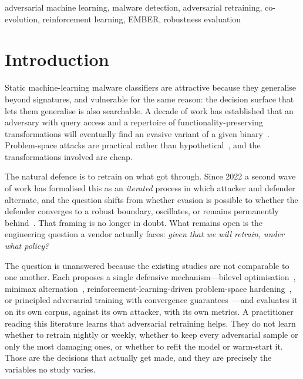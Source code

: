 \documentclass[conference]{IEEEtran}
\begin{document}
\begin{IEEEkeywords}
adversarial machine learning, malware detection, adversarial retraining,
co-evolution, reinforcement learning, EMBER, robustness evaluation
\end{IEEEkeywords}

\section{Introduction}

Static machine-learning malware classifiers are attractive because they
generalise beyond signatures, and vulnerable for the same reason: the decision
surface that lets them generalise is also searchable. A decade of work has
established that an adversary with query access and a repertoire of
functionality-preserving transformations will eventually find an evasive
variant of a given
binary~\cite{anderson2018rl,quertier2022merlin,song2022mab,demetrio2021exemples}.
Problem-space attacks are practical rather than
hypothetical~\cite{pierazzi2020problemspace}, and the transformations involved
are cheap.

The natural defence is to retrain on what got through. Since 2022 a second wave
of work has formalised this as an \emph{iterated} process in which attacker and
defender alternate, and the question shifts from whether evasion is possible to
whether the defender converges to a robust boundary, oscillates, or remains
permanently
behind~\cite{ebrahimi2022arl,jureckova2026bilevel,tsingenopoulos2024raid}. That
framing is no longer in doubt. What remains open is the engineering question a
vendor actually faces: \emph{given that we will retrain, under what policy?}

The question is unanswered because the existing studies are not comparable to
one another. Each proposes a single defensive mechanism---bilevel
optimisation~\cite{jureckova2026bilevel}, minimax
alternation~\cite{ebrahimi2022arl}, reinforcement-learning-driven problem-space
hardening~\cite{tsingenopoulos2024raid}, or principled adversarial training with
convergence guarantees~\cite{li2024pad}---and evaluates it on its own corpus,
against its own attacker, with its own metrics. A practitioner reading this
literature learns that adversarial retraining helps. They do not learn whether
to retrain nightly or weekly, whether to keep every adversarial sample or only
the most damaging ones, or whether to refit the model or warm-start it. Those
are the decisions that actually get made, and they are precisely the variables
no study varies.
\end{document}
